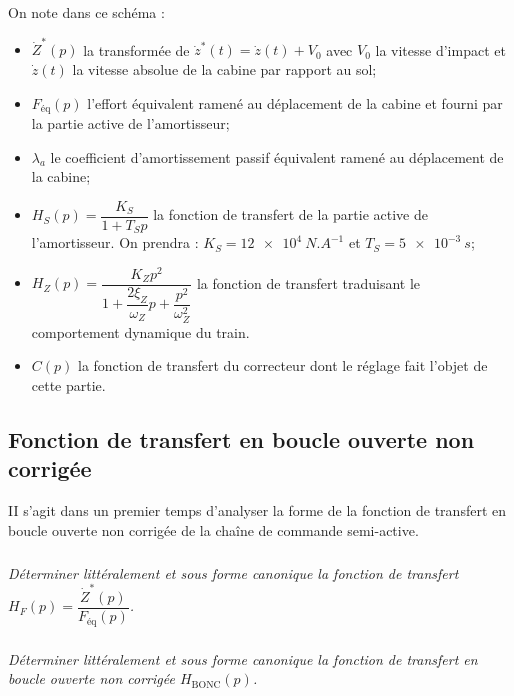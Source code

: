\documentclass[10pt,fleqn]{article} %
\begin{document}
\begin{multicols}{2}
On note dans ce schéma :
\begin{itemize}
\item $\dot{Z}^*(p)$ la transformée de $\dot{z}^*(t)=\dot{z}(t)+V_0$  avec $V_0$ la vitesse d'impact et $\dot{z}(t)$ la vitesse absolue de la cabine par rapport au sol;%
\item $F_{\text{éq}}(p)$  l'effort équivalent ramené au déplacement de la cabine et fourni par la partie active de l'amortisseur;%
\item $\lambda_a$ le coefficient d'amortissement passif équivalent ramené au déplacement de la cabine;
\item $H_S(p)=\dfrac{K_S}{1+T_Sp}$ la fonction de transfert de la partie active de l'amortisseur. %
On prendra : $K_S = \SI{12e4}{N.A^{-1}}$ et $T_S = \SI{5e-3}{s}$;
\item $H_Z(p)=\dfrac{K_Z p^2}{1+\dfrac{2\xi_Z}{\omega_Z}p+\dfrac{p^2}{\omega_Z^2}}$ la fonction de transfert traduisant le comportement dynamique du train.
\item $C(p)$ la fonction de transfert du correcteur dont le réglage fait l'objet de cette partie.
\end{itemize}
%
%

\subsection*{Fonction de transfert en boucle ouverte non corrigée}
\begin{obj}
II s'agit dans un premier temps d'analyser la forme de la fonction de transfert en boucle ouverte non corrigée de la chaîne de commande semi-active.
\end{obj}

\subparagraph{}\textit{Déterminer littéralement et sous forme canonique la fonction de transfert  $H_F(p)=\dfrac{\dot{Z}^*(p)}{F_{\text{éq}}(p)}$.}
\ifprof
\begin{corrige}
\end{corrige}
\else
\fi

\subparagraph{}\textit{Déterminer littéralement et sous forme canonique la fonction de transfert en boucle ouverte non corrigée $H_{\text{BONC}}(p)$.}
\ifprof
\begin{corrige}
\end{corrige}
\else
\fi


\end{multicols}
\end{document}
